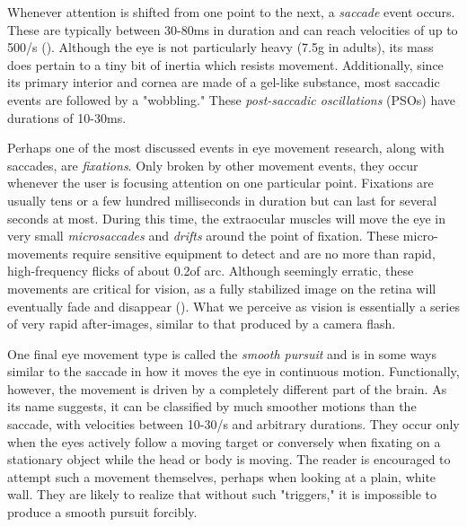 Whenever attention is shifted from one point to the next, a \textit{saccade} event occurs. These are typically between 30-80ms in duration and can reach velocities of up to 500\degree/s (\cite{holmqvist2011}). Although the eye is not particularly heavy (7.5g in adults), its mass does pertain to a tiny bit of inertia which resists movement. Additionally, since its primary interior and cornea are made of a gel-like substance, most saccadic events are followed by a "wobbling." These \textit{post-saccadic oscillations} (PSOs) have durations of 10-30ms.


Perhaps one of the most discussed events in eye movement research, along with saccades, are \textit{fixations}. Only broken by other movement events, they occur whenever the user is focusing attention on one particular point. Fixations are usually tens or a few hundred milliseconds in duration but can last for several seconds at most. During this time, the extraocular muscles will move the eye in very small \textit{microsaccades} and \textit{drifts} around the point of fixation. These micro-movements require sensitive equipment to detect and are no more than rapid, high-frequency flicks of about 0.2\degree of arc. Although seemingly erratic, these movements are critical for vision, as a fully stabilized image on the retina will eventually fade and disappear (\cite{oyster1999}). What we perceive as vision is essentially a series of very rapid after-images, similar to that produced by a camera flash.

One final eye movement type is called the \textit{smooth pursuit} and is in some ways similar to the saccade in how it moves the eye in continuous motion. Functionally, however, the movement is driven by a completely different part of the brain. As its name suggests, it can be classified by much smoother motions than the saccade, with velocities between 10-30\degree/s and arbitrary durations. They occur only when the eyes actively follow a moving target or conversely when fixating on a stationary object while the head or body is moving. The reader is encouraged to attempt such a movement themselves, perhaps when looking at a plain, white wall. They are likely to realize that without such "triggers," it is impossible to produce a smooth pursuit forcibly.









